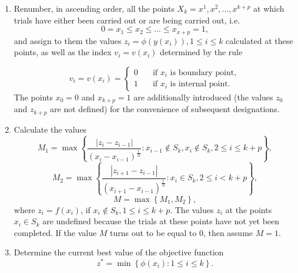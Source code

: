 \documentclass[runningheads]{llncs}
\begin{document}
\begin{enumerate}
\item Renumber, in ascending order, all the points $X_k={x^1,x^2,...,x^{k+p} }$ at which trials have either been carried out or are being carried out, i.e.
\[
0 = x_1 \leq x_2 \leq ... \leq x_{x+p} = 1,
\]
and assign to them the values $z_i = \phi(y(x_i)), 1 \leq i \leq k$ calculated at these points, as well as the index $v_i = v(x_i)$ determined by the rule

\begin{equation}\label{rule_points_index} 
v_i=v(x_i)=
\begin{cases}
    0     & \quad \text{if } x_i \text{ is boundary point},\\
    1     & \quad \text{if } x_i \text{ is internal point}.
\end{cases}
\end{equation}
The points $x_0=0$ and $x_{k+p}=1$ are additionally introduced (the values $z_0$ and $z_{k+p}$ are not defined) for the convenience of subsequent designations.

\item Calculate the values
\[
M_1= \max \left\{ \frac{|z_i - z_{i - 1}|}{(x_i - x_{i - 1})^\frac{1}{N}}: x_{i-1} \notin S_k, x_i \notin S_k, 2 \leq i \leq k+p \right\},
\]
\[
M_2= \max \left\{ \frac{|z_{i+1} - z_{i - 1}|}{(x_{i+1} - x_{i - 1})^\frac{1}{N}}: x_{i} \in S_k, 2 \leq i < k+p \right\},
\]
\[
M= \max \left\{ M_1, M_2 \right\},
\]
where $z_i=f(x_i)$, if $x_i \notin S_k, 1 \leq i \leq k+p$. The values $z_i$ at the points $x_i \in S_k$ are undefined because the trials at these points have not yet been completed. If the value $M$ turns out to be equal to $0$, then assume $M=1$.

\item Determine the current best value of the objective function
\begin{equation}\label{cur_best_val} 
z^* = \min \left\{ \phi(x_i): 1 \leq i \leq k \right\}.
\end{equation}


\end{enumerate}
\end{document}
